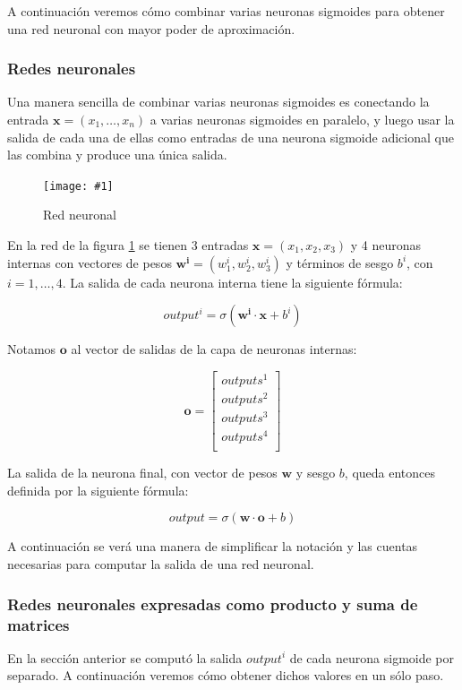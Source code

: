 \documentclass[a4paper, 10pt, twoside]{article}
\newcommand{\img}[3]{
  \begin{figure}[H]
    \begin{center}
      \texttt{[image: \#1]}
    \end{center}
    \caption{#2}
    \label{#3}
  \end{figure}
}
\begin{document}
A continuación veremos cómo combinar varias neuronas sigmoides para obtener una
red neuronal con mayor poder de aproximación.


\subsubsection{Redes neuronales}

Una manera sencilla de combinar varias neuronas sigmoides es conectando la
entrada $\bm{x} = (x_1, \ldots, x_n)$ a varias neuronas sigmoides en paralelo,
y luego usar la salida de cada una de ellas como entradas de una neurona
sigmoide adicional que las combina y produce una única salida.

\img{neural-network.png}{Red neuronal}{img:neural-network}

En la red de la figura \ref{img:neural-network} se tienen 3 entradas $\bm{x} =
(x_1, x_2, x_3)$ y 4 neuronas internas con vectores de pesos $\bm{w^i} =
(w^i_1, w^i_2, w^i_3)$ y términos de sesgo $b^i$, con $i = 1, \ldots, 4$. La
salida de cada neurona interna tiene la siguiente fórmula:

$$\mathit{output}^i = \sigma(\bm{w^i} \cdot \bm{x} + b^i)$$

Notamos $\bm{o}$ al vector de salidas de la capa de neuronas internas:

$$
\bm{o} =
\begin{bmatrix}
  \mathit{outputs^1} \\
  \mathit{outputs^2} \\
  \mathit{outputs^3} \\
  \mathit{outputs^4} \\
\end{bmatrix}
$$

La salida de la neurona final, con vector de pesos $\bm{w}$ y sesgo $b$, queda
entonces definida por la siguiente fórmula:

$$\mathit{output} = \sigma(\bm{w} \cdot \bm{o} + b)$$

A continuación se verá una manera de simplificar la notación y las cuentas
necesarias para computar la salida de una red neuronal.


\subsubsection{Redes neuronales expresadas como producto y suma de matrices}

En la sección anterior se computó la salida $\mathit{output}^i$ de cada neurona
sigmoide por separado. A continuación veremos cómo obtener dichos valores en un
sólo paso.
\end{document}
